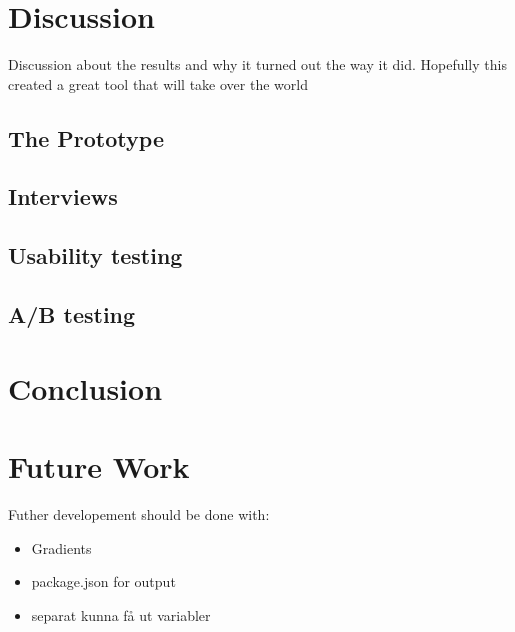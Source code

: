 \section{Discussion}
Discussion about the results and why it turned out the way it did. Hopefully this created a great tool that will take over the world


\subsection{The Prototype}%
\label{sub:The Prototype}

\subsection{Interviews}%
\label{sub:Interviews}

\subsection{Usability testing}%
\label{sub:Usability testing}

\subsection{A/B testing}%
\label{sub:A/B testing}

\section{Conclusion}
\label{sub:conclusion}

\section{Future Work}%
\label{sub:Future Work}
Futher developement should be done with:
\begin{itemize}
   \item Gradients
   \item package.json for output
   \item separat kunna få ut variabler 
\end{itemize}


